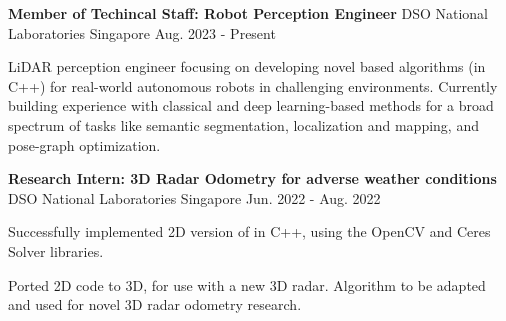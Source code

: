 


\begin{cventries}


\label{dsoFulltime}

\cventry
{
    \textbf{Member of Techincal Staff: Robot Perception Engineer}
} %
{DSO National Laboratories} %
{Singapore} %
{Aug. 2023 - Present} %
{ %
    \begin{cvitems}
        \item { LiDAR perception engineer focusing on developing novel based algorithms (in C++) for real-world autonomous robots in challenging environments. Currently building experience with classical and deep learning-based methods for a broad spectrum of tasks like semantic segmentation, localization and mapping, and pose-graph optimization. }
    \end{cvitems}
}



\label{radarSLAM}

\cventry
{
    \textbf{Research Intern: 3D Radar Odometry for adverse weather conditions} 
} %
{DSO National Laboratories} %
{Singapore} %
{Jun. 2022 - Aug. 2022} %
{ %
    \begin{cvitems}
        \item { Successfully implemented 2D version of  in C++, using the OpenCV and Ceres Solver libraries.}
        \item { Ported 2D code to 3D, for use with a new 3D radar. Algorithm to be adapted and used for novel 3D radar odometry research. }
    \end{cvitems}
}



\end{cventries}
